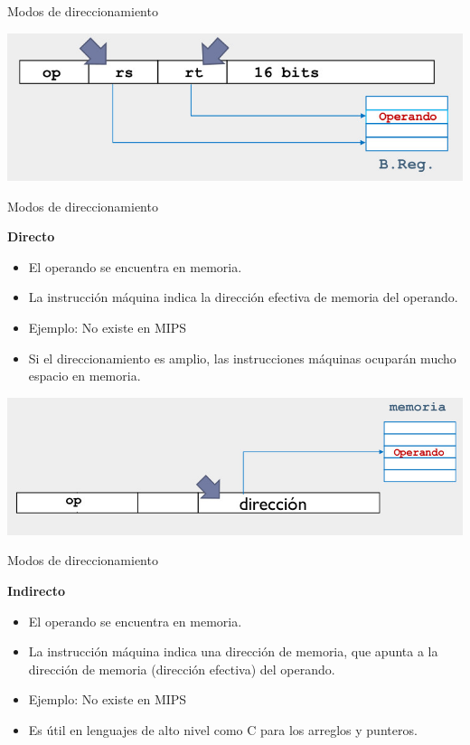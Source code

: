\documentclass[aspectratio=169,compress]{beamer}
\begin{document}
\begin{footnotesize}
\begin{frame}{Modos de direccionamiento}
\begin{itemize}
\end{itemize}

	\begin{center}
\includegraphics[scale=0.3]{images/dir-registro.jpg} 
	\end{center}
\end{frame}

\begin{frame}{Modos de direccionamiento}
\begin{center}\textbf{Directo}\end{center}

\begin{itemize}
\item El operando se encuentra en memoria.
\item La instrucción máquina indica la dirección efectiva de memoria del operando.
\item Ejemplo: No existe en MIPS
\item Si el direccionamiento es amplio, las instrucciones máquinas ocuparán mucho espacio en memoria.

\end{itemize}

	\begin{center}
\includegraphics[scale=0.3]{images/dir-directo.jpg} 
	\end{center}
\end{frame}


\begin{frame}{Modos de direccionamiento}
\begin{center}\textbf{Indirecto}\end{center}

\begin{itemize}
\item El operando se encuentra en memoria.
\item La instrucción máquina indica una dirección de memoria, que apunta a la dirección de memoria (dirección efectiva) del operando.
\item Ejemplo: No existe en MIPS
\item Es útil en lenguajes de alto nivel como C para los arreglos y punteros.


\end{itemize}
\end{frame}
\end{footnotesize}
\end{document}
